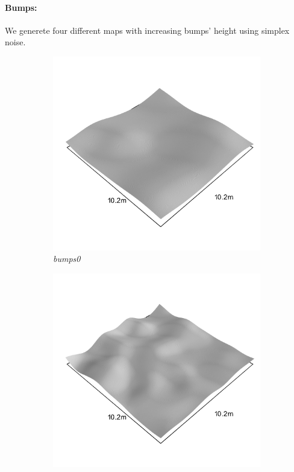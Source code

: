 \documentclass[../document.tex]{subfiles}
\begin{document}
\paragraph{Bumps:} 
We generete four different maps with increasing bumps' height using simplex noise. 
\begin{figure}[H]
    \centering
        \begin{subfigure}[b]{0.23\textwidth}
            \includegraphics[width=\textwidth]{../img/hm3d_borders/bumps0.png}
            \caption{\emph{bumps0}}
        \end{subfigure}
        \begin{subfigure}[b]{0.23\linewidth}
            \includegraphics[width=\textwidth]{../img/hm3d_borders/bumps1.png}

\end{subfigure}
\end{figure}
\end{document}
